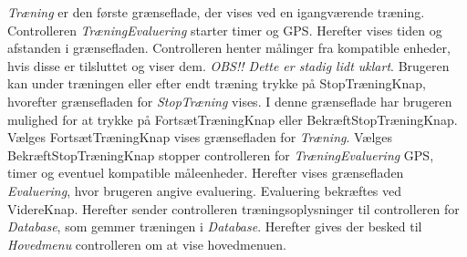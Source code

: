 \noindet
\textit{Træning} er den første grænseflade, der vises ved en igangværende træning. Controlleren \textit{TræningEvaluering} starter timer og GPS. Herefter vises tiden og afstanden i grænsefladen. Controlleren henter målinger fra kompatible enheder, hvis disse er tilsluttet og viser dem. \textit{OBS!! Dette er stadig lidt uklart}. Brugeren kan under træningen eller efter endt træning trykke på StopTræningKnap, hvorefter grænsefladen for \textit{StopTræning} vises. I denne grænseflade har brugeren mulighed for at trykke på FortsætTræningKnap eller BekræftStopTræningKnap. Vælges FortsætTræningKnap vises grænsefladen for \textit{Træning}. Vælges BekræftStopTræningKnap stopper controlleren for \textit{TræningEvaluering} GPS, timer og eventuel kompatible måleenheder. Herefter vises grænsefladen \textit{Evaluering}, hvor brugeren angive evaluering. Evaluering bekræftes ved VidereKnap. Herefter sender controlleren træningsoplysninger til controlleren for \textit{Database}, som gemmer træningen i \textit{Database}. Herefter gives der besked til \textit{Hovedmenu} controlleren om at vise hovedmenuen.




